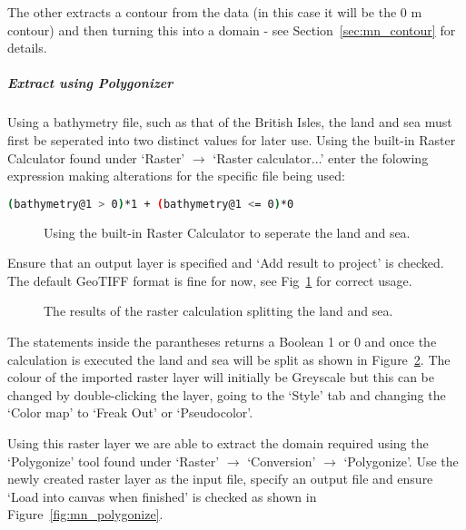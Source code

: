 The other extracts a contour from the data (in this case it will be the 0 m contour) and then turning this into a domain - see Section~\ref{sec:mn_contour} for details.

\subparagraph{Extract using Polygonizer \\}
\label{sec:mn_polygonizer}
Using a bathymetry file, such as that of the British Isles, the land and sea must first be seperated into two distinct values for later use. Using the built-in Raster Calculator found under `Raster' $\rightarrow$ `Raster calculator...' enter the folowing expression making alterations for the specific file being used: 

\begin{example}
  \begin{lstlisting}[language=bash]
  (bathymetry@1 > 0)*1 + (bathymetry@1 <= 0)*0
\end{lstlisting}
\end{example}

\begin{figure}[h!]
  \centering
  \caption{Using the built-in Raster Calculator to seperate the land and sea.}
  \label{fig:mn_rasterCalc}
\end{figure}

Ensure that an output layer is specified and `Add result to project' is checked. The default GeoTIFF format is fine for now, see Fig~\ref{fig:mn_rasterCalc} for correct usage.

\begin{figure}[h!]
  \centering
  \caption{The results of the raster calculation splitting the land and sea.}
  \label{fig:mn_landSea}
\end{figure}
		
The statements inside the parantheses returns a Boolean 1 or 0 and once the calculation is executed the land and sea will be split as shown in Figure~\ref{fig:mn_landSea}. The colour of the imported raster layer will initially be Greyscale but this can be changed by double-clicking the layer, going to the `Style' tab and changing the `Color map' to `Freak Out' or `Pseudocolor'.

Using this raster layer we are able to extract the domain required using the `Polygonize' tool found under `Raster' $\rightarrow$ `Conversion' $\rightarrow$ `Polygonize'. Use the newly created raster layer as the input file, specify an output file and ensure `Load into canvas when finished' is checked as shown in Figure~\ref{fig:mn_polygonize}.

